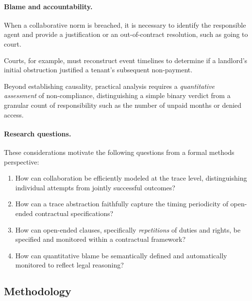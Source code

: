 \paragraph{Blame and accountability.}
When a collaborative norm is breached, it is necessary to identify the responsible agent and provide a justification or an out-of-contract resolution, such as going to court.

Courts, for example, must reconstruct event timelines to determine if a landlord's initial obstruction  justified a tenant's subsequent non-payment.

Beyond establishing causality, practical analysis requires a \emph{quantitative assessment} of non-compliance, distinguishing a simple binary verdict from a granular count of responsibility such as the number of unpaid months or denied access.





\paragraph{Research questions.}

These considerations motivate the following questions from a formal methods perspective:

\begin{enumerate}[RQ1]

\item How can collaboration be efficiently modeled at the trace level, distinguishing individual attempts from jointly successful outcomes?

\item How can a trace abstraction faithfully capture the timing periodicity of open-ended contractual specifications?

\item How can open-ended clauses, specifically \emph{repetitions} of duties and rights, be specified and monitored within a contractual framework?

\item How can quantitative blame be semantically defined and automatically monitored  to reflect legal reasoning?

\end{enumerate}



\subsection{Methodology}



